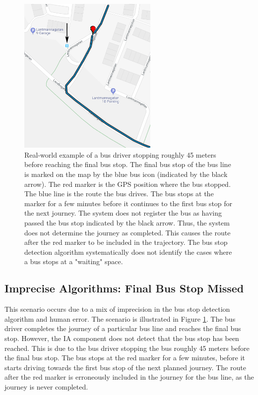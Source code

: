 \begin{figure}[!ht]
    \centering
    \includegraphics[width=0.6\textwidth]{figures/stopped_before_end}
    \caption[Real-world example of a bus driver stopping roughly 45 meters before reaching the final bus stop]
    {\small Real-world example of a bus driver stopping roughly 45 meters before reaching the final bus stop.
    The final bus stop of the bus line is marked on the map by the blue bus icon (indicated by the black arrow).
    The red marker is the GPS position where the bus stopped.
    The blue line is the route the bus drives.
    The bus stops at the marker for a few minutes before it continues to the first bus stop for the next journey.
    The system does not register the bus as having passed the bus stop indicated by the black arrow.
    Thus, the system does not determine the journey as completed.
    This causes the route after the red marker to be included in the trajectory.
    The bus stop detection algorithm systematically does not identify the cases where a bus stops at a "waiting" space.}
    \label{fig:stopped-before-end}
\end{figure}

\newpage
\subsection{Imprecise Algorithms: Final Bus Stop Missed}
This scenario occurs due to a mix of imprecision in the bus stop detection algorithm and human error.
The scenario is illustrated in Figure \ref{fig:stopped-before-end}.
The bus driver completes the journey of a particular bus line and reaches the final bus stop.
However, the IA component does not detect that the bus stop has been reached.
This is due to the bus driver stopping the bus roughly 45 meters before the final bus stop.
The bus stops at the red marker for a few minutes, before it starts driving towards the first bus stop of the next planned journey.
The route after the red marker is erroneously included in the journey for the bus line, as the journey is never completed.

